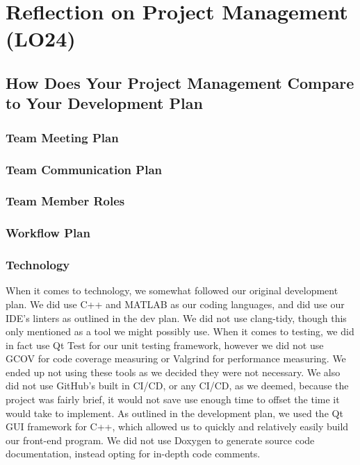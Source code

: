 \documentclass{article}
\begin{document}
\section{Reflection on Project Management (LO24)}


\subsection{How Does Your Project Management Compare to Your Development Plan}

\subsubsection{Team Meeting Plan}

\subsubsection{Team Communication Plan}

\subsubsection{Team Member Roles}

\subsubsection{Workflow Plan}

\subsubsection{Technology}
When it comes to technology, we somewhat followed our original development plan. We did use C++ and MATLAB as our coding languages, and did use our IDE's linters as outlined in the dev plan. We did not use clang-tidy, though this only mentioned as a tool we might possibly use. When it comes to testing, we did in fact use Qt Test for our unit testing framework, however we did not use GCOV for code coverage measuring or Valgrind for performance measuring. We ended up not using these tools as we decided they were not necessary. We also did not use GitHub's built in CI/CD, or any CI/CD, as we deemed, because the project was fairly brief, it would not save use enough time to offset the time it would take to implement. As outlined in the development plan, we used the Qt GUI framework for C++, which allowed us to quickly and relatively easily build our front-end program. We did not use Doxygen to generate source code documentation, instead opting for in-depth code comments.
\end{document}
